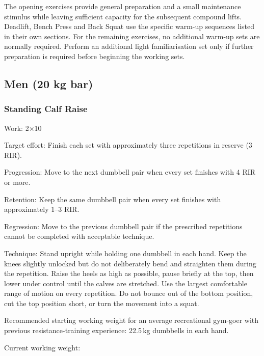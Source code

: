 \documentclass[11pt,a4paper]{article}
\begin{document}
The opening exercises provide general preparation and a small maintenance stimulus while leaving sufficient capacity for the subsequent compound lifts. Deadlift, Bench Press and Back Squat use the specific warm-up sequences listed in their own sections. For the remaining exercises, no additional warm-up sets are normally required. Perform an additional light familiarisation set only if further preparation is required before beginning the working sets.

\newpage
\subsection{Men (20 kg bar)}

\subsubsection{Standing Calf Raise}

Work: 2$\times$10

Target effort: Finish each set with approximately three repetitions in reserve (3 RIR).

Progression: Move to the next dumbbell pair when every set finishes with 4 RIR or more.

Retention: Keep the same dumbbell pair when every set finishes with approximately 1--3 RIR.

Regression: Move to the previous dumbbell pair if the prescribed repetitions cannot be completed with acceptable technique.

Technique: Stand upright while holding one dumbbell in each hand. Keep the knees slightly unlocked but do not deliberately bend and straighten them during the repetition. Raise the heels as high as possible, pause briefly at the top, then lower under control until the calves are stretched. Use the largest comfortable range of motion on every repetition. Do not bounce out of the bottom position, cut the top position short, or turn the movement into a squat.

Recommended starting working weight for an average recreational gym-goer with previous resistance-training experience: 22.5\,kg dumbbells in each hand.

Current working weight:
\end{document}
